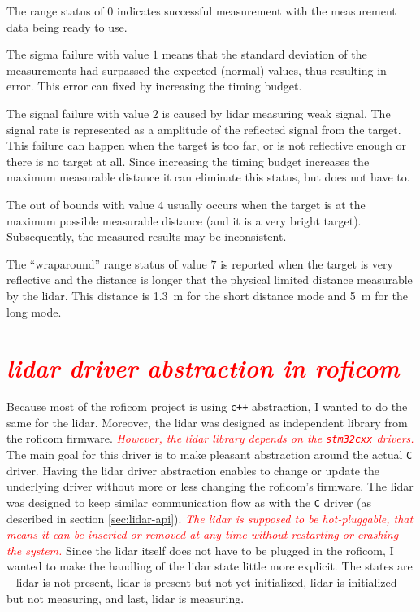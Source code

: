 \documentclass[
  digital,     %
  oneside,     %
  nosansbold,  %
  nocolorbold, %
  lof,         %
  lot,         %
]{fithesis4}
\newcommand{\TODO}[1]{\textcolor{red}{\textit{#1}}}
\begin{document}
{{{The range status of $0$ indicates successful measurement with the measurement data being ready to use.

The sigma failure with value $1$ means that the standard deviation of the measurements had surpassed the expected (normal) values, thus resulting in error. This error can fixed by increasing the timing budget.

The signal failure with value $2$ is caused by \acrshort{lidar} measuring weak signal. The signal rate is represented as a amplitude of the reflected signal from the target. This failure can happen when the target is too far, or is not reflective enough or there is no target at all. Since increasing the timing budget increases the maximum measurable distance it can eliminate this status, but does not have to.

The out of bounds with value $4$ usually occurs when the target is at the maximum possible measurable distance (and it is a very bright target). Subsequently, the measured results may be inconsistent.

The ``wraparound'' range status of value $7$ is reported when the target is very reflective and the distance is longer that the physical limited distance measurable by the \acrshort{lidar}. This distance is \qty{1.3}{\metre} for the short distance mode and \qty{5}{\metre} for the long mode.

\section{ \TODO{ \acrshort{lidar} driver abstraction in \acrshort{roficom} } }

Because most of the \acrshort{roficom} project is using \verb|c++| abstraction, I wanted to do the same for the \acrshort{lidar}. Moreover, the \acrshort{lidar} was designed as independent library from the \acrshort{roficom} firmware. \TODO{However, the \acrshort{lidar} library depends on the \texttt{stm32cxx} drivers.} The main goal for this driver is to make pleasant abstraction around the actual \verb|C| driver. Having the \acrshort{lidar} driver abstraction enables to change or update the underlying driver without more or less changing the \acrshort{roficom}'s firmware. The \acrshort{lidar} was designed to keep similar communication flow as with the \verb|C| driver (as described in section \ref{sec:lidar-api}). \TODO{The \acrshort{lidar} is supposed to be \emph{hot-pluggable}, that means it can be inserted or removed at any time without restarting or crashing the system.} Since the \acrshort{lidar} itself does not have to be plugged in the \acrshort{roficom}, I wanted to make the handling of the \acrshort{lidar} state little more explicit. The states are -- \acrshort{lidar} is not present, \acrshort{lidar} is present but not yet initialized, \acrshort{lidar} is initialized but not measuring, and last, \acrshort{lidar} is measuring. 

}}}
\end{document}
